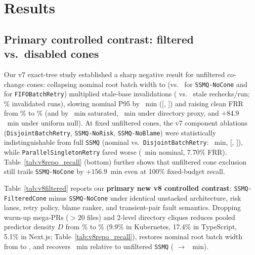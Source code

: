 \section{Results}
\label{sec:results}


\subsection{Primary controlled contrast: filtered vs.\ disabled cones}
Our v7 exact-tree study established a sharp negative result for unfiltered co-change cones: collapsing nominal root batch width to \NomSsmqWidth{} (vs.\ \NomNoConeWidth{} for \texttt{SSMQ-NoCone} and \NomFifoRetryWidth{} for \texttt{FIFOBatchRetry}) multiplied stale-base invalidations (\SsmqNomStale{} vs.\ \NoConeNomStale{} stale rechecks/run; \NomSsmqInv{}\% invalidated runs), slowing nominal P95 by \NomVsNoCone{}~min ([\NomVsNoConeLo{}, \NomVsNoConeHi{}]) and raising clean FRR from \NomNoConeFrr{}\% to \NomSsmqFrr{}\% (and by \SatVsNoCone{}~min saturated, \DirVsNoCone{}~min under directory proxy, and $+84.9$~min under uniform null). At fixed unfiltered cones, the v7 component ablations (\texttt{DisjointBatchRetry}, \texttt{SSMQ-NoRisk}, \texttt{SSMQ-NoBlame}) were statistically indistinguishable from full \texttt{SSMQ} (nominal vs.\ \texttt{DisjointBatchRetry}: \NomVsDisj{}~min, [\NomVsDisjLo{}, \NomVsDisjHi{}]), while \texttt{ParallelSingletonRetry} fared worse (\NomSingP{}~min nominal, 7.70\% FRR). Table~\ref{tab:v8repo_recall} (bottom) further shows that unfiltered cone exclusion still trails \texttt{SSMQ-NoCone} by $+156.9$~min even at 100\% fixed-budget recall.

Table~\ref{tab:v8filtered} reports our \textbf{primary new v8 controlled contrast}: \texttt{SSMQ-FilteredCone} minus \texttt{SSMQ-NoCone} under identical unstacked architecture, risk lanes, retry policy, blame ranker, and transient-pair fault semantics. Dropping warm-up mega-PRs ($>20$ files) and 2-level directory cliques reduces pooled predictor density $D$ from \UnfDensity{}\% to \FcDensity{}\% (9.9\% in Kubernetes, 17.4\% in TypeScript, 5.1\% in Next.js; Table~\ref{tab:v8repo_recall}), restores nominal root batch width from \NomSsmqWidth{} to \FcNomWidth{}, and recovers \FcNomGainVsUnf{}~min relative to unfiltered \texttt{SSMQ} (\NomSsmqP{} $\to$ \FcNomP{}~min).

